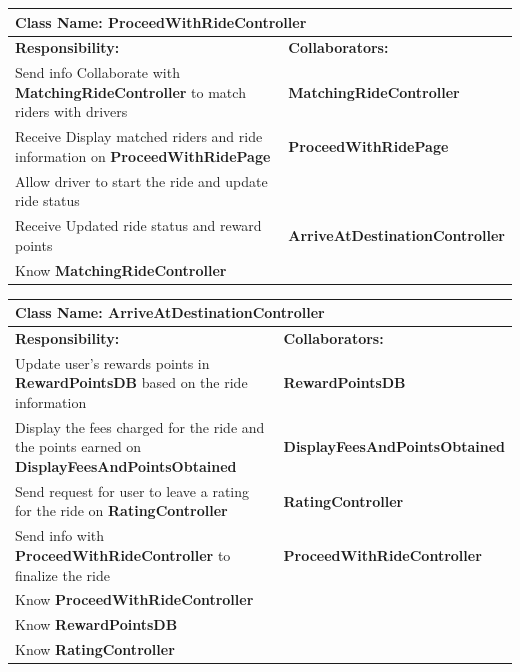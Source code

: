 \documentclass[]{article}
\begin{document}
\begin{table}[H]
    \centering
    \begin{tabular}{|p{5cm}|p{5cm}|}
    \hline
    \multicolumn{2}{|l|}{\textbf{Class Name:} ProceedWithRideController} \\
    \hline
    \textbf{Responsibility:} & \textbf{Collaborators:} \\
    \hline
    Send info Collaborate with \textbf{MatchingRideController} to match riders with drivers & \textbf{MatchingRideController} \\
    \hline
    Receive Display matched riders and ride information on \textbf{ProceedWithRidePage} & \textbf{ProceedWithRidePage} \\
    \hline
    Allow driver to start the ride and update ride status & \phantom{} \\
    \hline
    Receive Updated ride status and reward points & \textbf{ArriveAtDestinationController}\\
    \hline
     Know \textbf{MatchingRideController}  & \phantom{} \\
    \hline
    \end{tabular}
\end{table}

\begin{table}[H]
    \centering
    \begin{tabular}{|p{5cm}|p{5cm}|}
    \hline
    \multicolumn{2}{|l|}{\textbf{Class Name:} ArriveAtDestinationController} \\
    \hline
    \textbf{Responsibility:} & \textbf{Collaborators:} \\
    \hline
    Update user's rewards points in \textbf{RewardPointsDB} based on the ride information & \textbf{RewardPointsDB} \\
    \hline
    Display the fees charged for the ride and the points earned on \textbf{DisplayFeesAndPointsObtained} & \textbf{DisplayFeesAndPointsObtained} \\
    \hline
    Send request for user to leave a rating for the ride on \textbf{RatingController} & \textbf{RatingController} \\
    \hline
     Send info with \textbf{ProceedWithRideController} to finalize the ride & \textbf{ProceedWithRideController} \\
    \hline
    Know \textbf{ProceedWithRideController}  & \phantom{} \\
    \hline
    Know \textbf{RewardPointsDB}  & \phantom{} \\
    \hline
    Know \textbf{RatingController}  & \phantom{} \\
    \hline
    \end{tabular}
\end{table}
\end{document}
